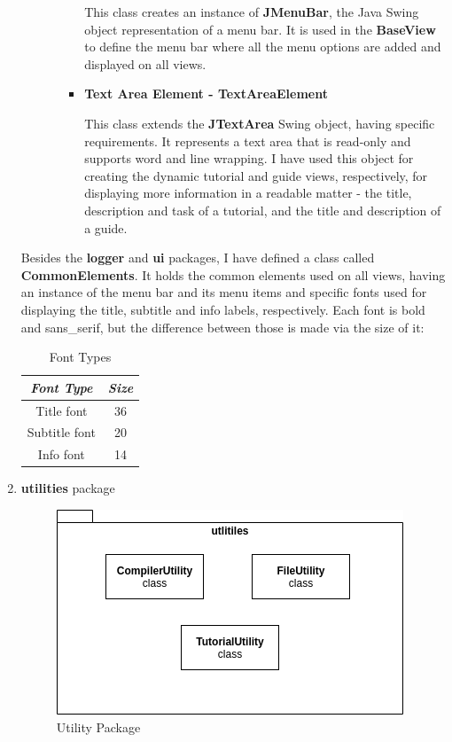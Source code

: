 \documentclass[12pt,a4paper,twoside]{report}
\begin{document}
\begin{enumerate}
\begin{itemize}
\begin{itemize}
\begin{itemize}
	This class creates an instance of \textbf{JMenuBar}, the Java Swing object representation of a menu bar. It is used in the \textbf{BaseView} to define the menu bar where all the menu options are added and displayed on all views. 
	
\item \textbf{Text Area Element - TextAreaElement}

	This class extends the \textbf{JTextArea} Swing object, having specific requirements. It represents a text area that is read-only and supports word and line wrapping. I have used this object for creating the dynamic tutorial and guide views, respectively, for displaying more information in a readable matter - the title, description and task of a tutorial, and the title and description of a guide.
	
\end{itemize}
\end{itemize}
\end{itemize}

Besides the \textbf{logger} and \textbf{ui} packages, I have defined a class called \textbf{CommonElements}. It holds the common elements used on all views, having an instance of the menu bar and its menu items and specific fonts used for displaying the title, subtitle and info labels, respectively. Each font is bold and sans\_serif, but the difference between those is made via the size of it:

\begin{table}[H]
\centering
\begin{tabular}{|c|c|}
\hline
\textit{\textbf{Font Type}} & \textit{\textbf{Size}} \\ \hline
Title font                  & 36                     \\ \hline
Subtitle font               & 20                     \\ \hline
Info font                   & 14                     \\ \hline
\end{tabular}
\caption{Font Types}
\label{tab:my-table}
\end{table}

\item \textbf{utilities} package

\begin{figure}[H]
    \centering
    \includegraphics[width=0.6\linewidth]{img/diags/UtilityPackage.png}
    \caption{Utility Package}
    \label{fig:conf}
\end{figure}


\end{enumerate}
\end{document}
